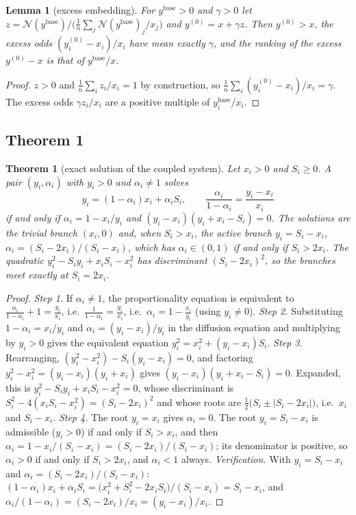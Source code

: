 \documentclass[11pt,a4paper]{article}
\newtheorem{theorem}{Theorem}
\newtheorem{lemma}{Lemma}
\theoremstyle{definition}
\theoremstyle{plain}
\newcommand{\N}{\mathcal{N}}
\begin{document}
\begin{lemma}[excess embedding]\label{lem:embed}
For $y^{\mathrm{base}}>0$ and $\gamma>0$ let $z=\N(y^{\mathrm{base}})/\big(\tfrac1n\sum_j\N(y^{\mathrm{base}})_j/x_j\big)$ and $y^{(0)}=x+\gamma z$. Then $y^{(0)}>x$, the excess odds $(y^{(0)}_i-x_i)/x_i$ have mean exactly $\gamma$, and the ranking of the excess $y^{(0)}-x$ is that of $y^{\mathrm{base}}/x$.
\end{lemma}

\begin{proof}
$z>0$ and $\frac1n\sum_iz_i/x_i=1$ by construction, so $\frac1n\sum_i(y^{(0)}_i-x_i)/x_i=\gamma$. The excess odds $\gamma z_i/x_i$ are a positive multiple of $y^{\mathrm{base}}_i/x_i$.
\end{proof}

\subsection{Theorem 1}

\begin{theorem}[exact solution of the coupled system]\label{thm:factor}
Let $x_i>0$ and $S_i\ge0$. A pair $(y_i,\alpha_i)$ with $y_i>0$ and $\alpha_i\ne1$ solves
\[
y_i=(1-\alpha_i)x_i+\alpha_iS_i,\qquad \frac{\alpha_i}{1-\alpha_i}=\frac{y_i-x_i}{x_i}
\]
if and only if $\alpha_i=1-x_i/y_i$ and $(y_i-x_i)(y_i+x_i-S_i)=0$. The solutions are the trivial branch $(x_i,0)$ and, when $S_i>x_i$, the active branch $y_i=S_i-x_i$, $\alpha_i=(S_i-2x_i)/(S_i-x_i)$, which has $\alpha_i\in(0,1)$ if and only if $S_i>2x_i$. The quadratic $y_i^2-S_iy_i+x_iS_i-x_i^2$ has discriminant $(S_i-2x_i)^2$, so the branches meet exactly at $S_i=2x_i$.
\end{theorem}

\begin{proof}
\emph{Step 1.} If $\alpha_i\ne1$, the proportionality equation is equivalent to $\frac{\alpha_i}{1-\alpha_i}+1=\frac{y_i}{x_i}$, i.e.\ $\frac1{1-\alpha_i}=\frac{y_i}{x_i}$, i.e.\ $\alpha_i=1-\frac{x_i}{y_i}$ (using $y_i\ne0$). \emph{Step 2.} Substituting $1-\alpha_i=x_i/y_i$ and $\alpha_i=(y_i-x_i)/y_i$ in the diffusion equation and multiplying by $y_i>0$ gives the equivalent equation $y_i^2=x_i^2+(y_i-x_i)S_i$. \emph{Step 3.} Rearranging, $(y_i^2-x_i^2)-S_i(y_i-x_i)=0$, and factoring $y_i^2-x_i^2=(y_i-x_i)(y_i+x_i)$ gives $(y_i-x_i)(y_i+x_i-S_i)=0$. Expanded, this is $y_i^2-S_iy_i+x_iS_i-x_i^2=0$, whose discriminant is $S_i^2-4(x_iS_i-x_i^2)=(S_i-2x_i)^2$ and whose roots are $\tfrac12\big(S_i\pm|S_i-2x_i|\big)$, i.e.\ $x_i$ and $S_i-x_i$. \emph{Step 4.} The root $y_i=x_i$ gives $\alpha_i=0$. The root $y_i=S_i-x_i$ is admissible ($y_i>0$) if and only if $S_i>x_i$, and then $\alpha_i=1-x_i/(S_i-x_i)=(S_i-2x_i)/(S_i-x_i)$; its denominator is positive, so $\alpha_i>0$ if and only if $S_i>2x_i$, and $\alpha_i<1$ always. \emph{Verification.} With $y_i=S_i-x_i$ and $\alpha_i=(S_i-2x_i)/(S_i-x_i)$: $(1-\alpha_i)x_i+\alpha_iS_i=\big(x_i^2+S_i^2-2x_iS_i\big)/(S_i-x_i)=S_i-x_i$, and $\alpha_i/(1-\alpha_i)=(S_i-2x_i)/x_i=(y_i-x_i)/x_i$.
\end{proof}
\end{document}
